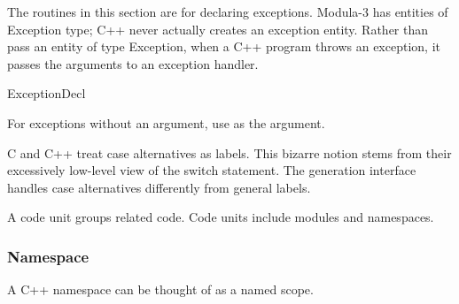 The routines in this section are for declaring exceptions.  Modula-3
has entities of Exception type; C++ never actually creates an
exception entity.  Rather than pass an entity of type Exception, when a
C++ program throws an exception, it passes the arguments to an
exception handler.

	{}{ExceptionDecl}
\begin{functionality}
For exceptions without an argument, use  as the
 argument.
\end{functionality}


   

C and C++ treat case alternatives as labels.  This bizarre notion
stems from their excessively low-level view of the switch statement.  
The generation interface handles case alternatives differently from
general labels.  


\label{sec:unit}
A code unit groups related code.  Code units include modules and
namespaces.  


\subsubsection{Namespace}\label{sec:namespace}
A C++ namespace can be thought of as a named scope.  

